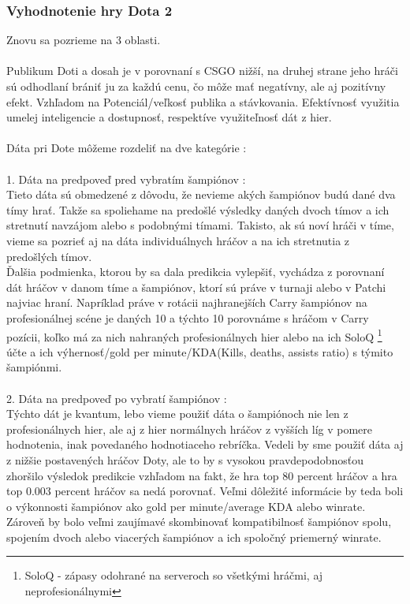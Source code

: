 \subsubsection{Vyhodnotenie hry Dota 2}
Znovu sa pozrieme na 3 oblasti. \\ \\ 
Publikum Doti a dosah je v porovnaní s CSGO nižší, na druhej strane jeho hráči sú odhodlaní brániť ju za každú cenu, čo môže mať negatívny, ale aj pozitívny efekt. Vzhľadom na  Potenciál/veľkosť publika a stávkovania. Efektívnosť využitia umelej inteligencie a dostupnosť, respektíve využiteľnosť dát z hier.
\\ \\
Dáta pri Dote môžeme rozdeliť na dve kategórie : 
\\ \\
1. Dáta na predpoveď pred vybratím šampiónov : \\
Tieto dáta sú obmedzené z dôvodu, že nevieme akých šampiónov budú dané dva tímy hrať. Takže sa spoliehame na predošlé výsledky daných dvoch tímov a ich stretnutí navzájom alebo s podobnými tímami. Takisto, ak sú noví hráči v tíme, vieme sa pozrieť aj na dáta individuálnych hráčov a na ich stretnutia z predošlých tímov. \\
Ďalšia podmienka, ktorou by sa dala predikcia vylepšiť, vychádza z porovnaní dát hráčov v danom tíme a šampiónov, ktorí sú práve v turnaji alebo v Patchi najviac hraní. Napríklad práve v rotácii najhranejších Carry šampiónov na profesionálnej scéne je daných 10 a týchto 10 porovnáme s hráčom v Carry pozícii, koľko má za nich nahraných profesionálnych hier alebo na ich SoloQ \footnote {
	SoloQ - zápasy odohrané na serveroch so všetkými hráčmi, aj neprofesionálnymi
} účte a ich výhernosť/gold per minute/KDA(Kills, deaths, assists ratio) s týmito šampiónmi.  
\\ \\
2. Dáta na predpoveď po vybratí šampiónov : \\
Týchto dát je kvantum, lebo vieme použiť dáta o šampiónoch nie len z profesionálnych hier, ale aj z hier normálnych hráčov z vyšších líg v pomere hodnotenia, inak povedaného hodnotiaceho rebríčka. Vedeli by sme použiť dáta aj z nižšie postavených hráčov Doty, ale to by s vysokou pravdepodobnosťou zhoršilo výsledok predikcie vzhľadom na fakt, že hra top 80 percent hráčov a hra top 0.003 percent hráčov sa nedá porovnať. Veľmi dôležité informácie by teda boli o výkonnosti šampiónov ako gold per minute/average KDA alebo winrate. Zároveň by bolo veľmi zaujímavé skombinovať kompatibilnosť šampiónov spolu, spojením dvoch alebo viacerých šampiónov a ich spoločný priemerný winrate.


